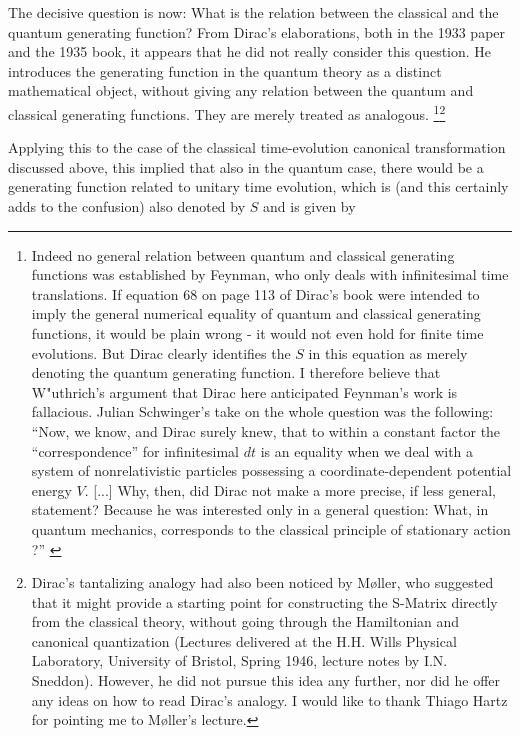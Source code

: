 \documentclass[12pt,a4paper]{article}
\begin{document}
The decisive question is now: What is the relation between the classical and the quantum generating function? From Dirac's elaborations, both in the 1933 paper and the 1935 book, it appears that he did not really consider this question. He introduces the generating function in the quantum theory as a distinct mathematical object, without giving any relation between the quantum and classical generating functions. They are merely treated as analogous. \footnote{Indeed no general relation between quantum and classical generating functions was established by Feynman, who only deals with infinitesimal time translations. If equation 68 on page 113 of Dirac's book were intended to imply the general numerical equality of quantum and classical generating functions, it would be plain wrong - it would not even hold for finite time evolutions. But Dirac clearly identifies the $S$ in this equation as merely denoting the quantum generating function. I therefore believe that W"uthrich's argument that Dirac here anticipated Feynman's work \citep[p.53]{wuethrich_2010_the-genesis} is fallacious. Julian Schwinger's take on the whole question was the following: ``Now, we know, and Dirac surely knew, that to within a constant factor the ``correspondence'' for infinitesimal $dt$ is an equality when we deal with a system of nonrelativistic particles possessing a coordinate-dependent potential energy $V$. [...] Why, then, did Dirac not make a more precise, if less general, statement? Because he was interested only in a general question: What, in quantum mechanics, corresponds to the classical principle of stationary action ?'' \citep{schwinger_1989_a-path}}\footnote{Dirac's tantalizing analogy had also been noticed by M\o ller, who suggested that it might provide a starting point for constructing the S-Matrix directly from the classical theory, without going through the Hamiltonian and canonical quantization (Lectures delivered at the H.H. Wills Physical Laboratory, University of Bristol, Spring 1946, lecture notes by I.N. Sneddon). However, he did not pursue this idea any further, nor did he offer any ideas on how to read Dirac's analogy. I would like to thank Thiago Hartz for pointing me to M\o ller's lecture.}

Applying this to the case of the classical time-evolution canonical transformation discussed above, this implied that also in the quantum case, there would be a generating function related to unitary time evolution, which is (and this certainly adds to the confusion) also denoted by $S$ and is given by
\end{document}
